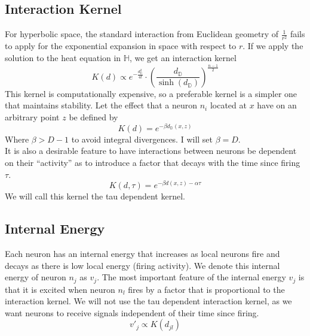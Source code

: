 \documentclass{article}
\begin{document}
\subsection{Interaction Kernel}
For hyperbolic space, the standard interaction from Euclidean geometry of $\frac{1}{r^2}$ fails to apply for the exponential expansion in space with respect to $r$. If we apply the solution to the heat equation in $\mathbb{H}$, we get an interaction kernel
\begin{equation} 
K(d) \propto e^{-\frac{d_{\mathbb{D}}^2}{4t}} \cdot \left( \frac{d_{\mathbb{D}}}{\sinh(d_{\mathbb{D}})} \right)^{\frac{n-1}{2}} 
\end{equation}
This kernel is computationally expensive, so a preferable kernel is a simpler one that maintains stability. Let the effect that a neuron $n_i$ located at $x$ have on an arbitrary point $z$ be defined by
\begin{equation} K(d) = e^{-\beta d_{\mathbb{D}}(x, z)} \end{equation}
Where $\beta > D-1$ to avoid integral divergences. I will set $\beta = D$. \\

It is also a desirable feature to have interactions between neurons be dependent on their ``activity'' as to introduce a factor that decays with the time since firing $\tau$.
\begin{equation}
    K(d,\tau) =e^{-\beta d(x,z) - \alpha\tau}
\end{equation}
We will call this kernel the tau dependent kernel.

\subsection{Internal Energy}
Each neuron has an internal energy that increases as local neurons fire and decays as there is low local energy (firing activity). We denote this internal energy of neuron $n_j$ as $v_j$. The most important feature of the internal energy $v_j$ is that it is excited when neuron $n_l$ fires by a factor that is proportional to the interaction kernel. We will not use the tau dependent interaction kernel, as we want neurons to receive signals independent of their time since firing.
\begin{equation}
    v'_j \propto K(d_{jl} )
\end{equation}
\end{document}
